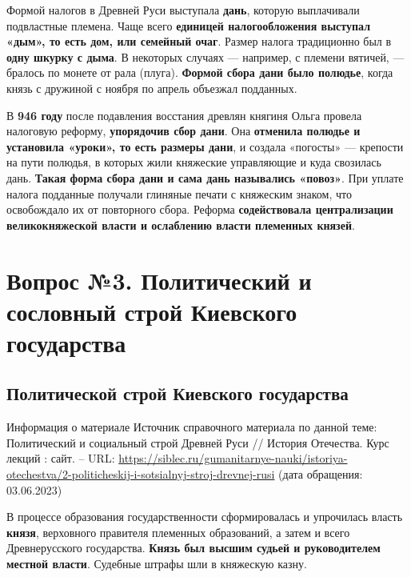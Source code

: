 \documentclass{article}
\begin{document}
\hfill

Формой налогов в Древней Руси выступала \textbf{дань}, которую выплачивали подвластные племена. Чаще всего \textbf{единицей налогообложения выступал «дым», то есть дом, или семейный очаг}. Размер налога традиционно был в \textbf{одну шкурку с дыма}. В некоторых случаях — например, с племени вятичей, — бралось по монете от рала (плуга). \textbf{Формой сбора дани было полюдье}, когда князь с дружиной с ноября по апрель объезжал подданных.

В \textbf{946 году} после подавления восстания древлян княгиня Ольга провела налоговую реформу, \textbf{упорядочив сбор дани}. Она \textbf{отменила полюдье и установила «уроки», то есть размеры дани}, и создала «погосты» — крепости на пути полюдья, в которых жили княжеские управляющие и куда свозилась дань. \textbf{Такая форма сбора дани и сама дань назывались «повоз»}. При уплате налога подданные получали глиняные печати с княжеским знаком, что освобождало их от повторного сбора. Реформа \textbf{содействовала централизации великокняжеской власти и ослаблению власти племенных князей}.

\pagebreak
\section{Вопрос №3. Политический и сословный строй Киевского государства}

\subsection{Политической строй Киевского государства}

\begin{bclogo}[logo=\bcinfo, couleurBarre=orange, noborder=true, couleur=white]{Информация о материале}
    Источник справочного материала по данной теме: Политический и социальный строй Древней Руси // История Отечества. Курс лекций : сайт. – URL: \href{https://siblec.ru/gumanitarnye-nauki/istoriya-otechestva/2-politicheskij-i-sotsialnyj-stroj-drevnej-rusi}{https://siblec.ru/gumanitarnye-nauki/istoriya-otechestva/2-politicheskij-i-sotsialnyj-stroj-drevnej-rusi} (дата обращения: 03.06.2023)
\end{bclogo}

В процессе образования государственности сформировалась и упрочилась власть \textbf{князя}, верховного правителя племенных образований, а затем и всего Древнерусского государства. \textbf{Князь был высшим судьей и руководителем местной власти}. Судебные штрафы шли в княжескую казну.
\end{document}
